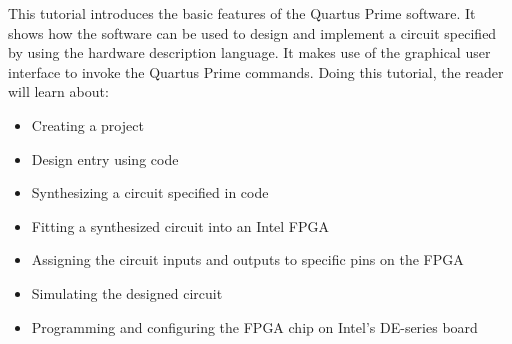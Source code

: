 \noindent
This tutorial introduces the basic features of the Quartus Prime software. 
It shows how the software can be used to design and implement a circuit specified by
using the \typeName{} hardware description language.
It makes use of the graphical user interface to invoke the Quartus Prime commands.
Doing this tutorial, the reader will learn about:
\begin{itemize}
\item Creating a project
\item Design entry using \typeName{} code
\item Synthesizing a circuit specified in \typeName{} code
\item Fitting a synthesized circuit into an Intel FPGA
\item Assigning the circuit inputs and outputs to specific pins on the FPGA
\item Simulating the designed circuit
\item Programming and configuring the FPGA chip on Intel's DE-series board
\end{itemize}
